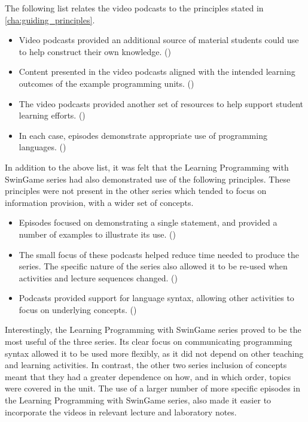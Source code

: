 The following list relates the video podcasts to the principles stated in \cref{cha:guiding_principles}.
\begin{itemize}[noitemsep,nolistsep]
  \item Video podcasts provided an additional source of material students could use to help construct their own knowledge. ()
  \item Content presented in the video podcasts aligned with the intended learning outcomes of the example programming units. ()
  \item The video podcasts provided another set of resources to help support student learning efforts. ()
  \item In each case, episodes demonstrate appropriate use of programming languages. ()
\end{itemize}

In addition to the above list, it was felt that the Learning Programming with SwinGame series had also demonstrated use of the following principles. These principles were not present in the other series which tended to focus on information provision, with a wider set of concepts. 
\begin{itemize}[noitemsep,nolistsep]
  \item Episodes focused on demonstrating a single statement, and provided a number of examples to illustrate its use. ()
  \item The small focus of these podcasts helped reduce time needed to produce the series. The specific nature of the series also allowed it to be re-used when activities and lecture sequences changed. ()
  \item Podcasts provided support for language syntax, allowing other activities to focus on underlying concepts. ()
\end{itemize}

Interestingly, the Learning Programming with SwinGame series proved to be the most useful of the three series. Its clear focus on communicating programming syntax allowed it to be used more flexibly, as it did not depend on other teaching and learning activities. In contrast, the other two series inclusion of concepts meant that they had a greater dependence on how, and in which order, topics were covered in the unit. The use of a larger number of more specific episodes in the Learning Programming with SwinGame series, also made it easier to incorporate the videos in relevant lecture and laboratory notes.

